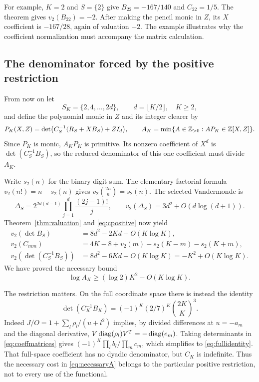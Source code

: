 For example, $K=2$ and $S=\{2\}$ give
$B_{22}=-167/140$ and $C_{22}=1/5$. The theorem gives
$v_2(B_{22})=-2$. After making the pencil monic in $Z$, its $X$
coefficient is $-167/28$, again of valuation $-2$. The example
illustrates why the coefficient normalization must accompany the
matrix calculation.

\subsection{The denominator forced by the positive restriction}
From now on let
\begin{equation}\label{eq:selected}
 S_K=\{2,4,\ldots,2d\},\qquad d=\lfloor K/2\rfloor,\quad K\geq2,
\end{equation}
and define the polynomial monic in $Z$ and its integer clearer by
\begin{equation}\label{eq:monic}
 P_K(X,Z)=\det\bigl(C_S^{-1}(R_S+XB_S)+ZI_d\bigr),\qquad
 A_K=\min\{A\in\mathbb Z_{>0}:AP_K\in\mathbb Z[X,Z]\}.
\end{equation}
Since $P_K$ is monic, $A_KP_K$ is primitive. Its nonzero coefficient
of $X^d$ is $\det(C_S^{-1}B_S)$, so the reduced denominator of this
one coefficient must divide $A_K$.

Write $s_2(n)$ for the binary digit sum. The elementary factorial
formula $v_2(n!)=n-s_2(n)$ gives
$v_2\binom{2n}{n}=s_2(n)$. The selected Vandermonde is
\[
 \Delta_S=2^{2d(d-1)}\prod_{j=1}^d\frac{(2j-1)!}{j},
 \qquad v_2(\Delta_S)=3d^2+O(d\log(d+1)).
\]
Theorem~\ref{thm:valuation} and \eqref{eq:cpositive} now yield
\begin{align*}
 v_2(\det B_S)&=8d^2-2Kd+O(K\log K),\\
 v_2(C_{mm})&=4K-8+v_2(m)-s_2(K-m)-s_2(K+m),\\
 v_2(\det(C_S^{-1}B_S))&=8d^2-6Kd+O(K\log K)
 =-K^2+O(K\log K).
\end{align*}
We have proved the necessary bound
\begin{equation}\label{eq:necessaryA}
 \log A_K\geq(\log2)K^2-O(K\log K).
\end{equation}

The restriction matters. On the full coordinate space there is instead
the identity
\begin{equation}\label{eq:fullidentity}
 \det(C_K^{-1}B_K)=(-1)^K(2/7)^K\binom{2K}{K}^3.
\end{equation}
Indeed $J/O=1+\sum_l\rho_l/(u+l^2)$ implies, by divided differences
at $u=-a_m$ and the diagonal derivative,
$V\operatorname{diag}(\rho_l)V^T=-\operatorname{diag}(e_m)$. Taking determinants in
\eqref{eq:coeffmatrices} gives $(-1)^K\prod_l b_l/\prod_m c_m$,
which simplifies to \eqref{eq:fullidentity}. That full-space
coefficient has no dyadic denominator, but $C_K$ is indefinite.
Thus the necessary cost in \eqref{eq:necessaryA} belongs to the
particular positive restriction, not to every use of the functional.
